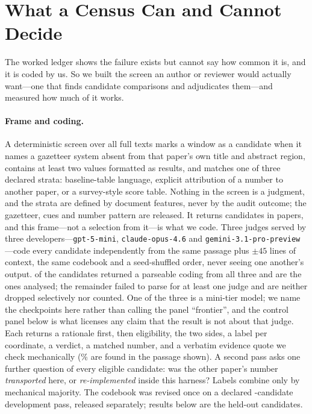 \documentclass[11pt]{article}
\begin{document}
\section{What a Census Can and Cannot Decide}
\label{sec:census}

The worked ledger shows the failure exists but cannot say how common it is, and
it is coded by us. So we built the screen an author or reviewer would actually
want---one that finds candidate comparisons and adjudicates them---and measured
how much of it works.

\paragraph{Frame and coding.}
A deterministic screen over all \FrameScreened{} full texts marks a window as a
candidate when it names a gazetteer system absent from that paper's own title
and abstract region, contains at least two values formatted as results, and
matches one of three declared strata: baseline-table language, explicit
attribution of a number to another paper, or a survey-style score table.
Nothing in the screen is a judgment, and the strata are defined by document
features, never by the audit outcome; the gazetteer, cues and number pattern
are released. It returns \FrameCandidates{} candidates in \FrameFiles{} papers,
and this frame---not a selection from it---is what we code. Three judges served
by three developers---\texttt{gpt-5-mini}, \texttt{claude-opus-4.6} and
\texttt{gemini-3.1-pro-preview}---code every candidate independently from the
same passage plus $\pm45$ lines of context, the same codebook and a
seed-shuffled order, never seeing one another's output. \CensusCoded{} of the
\FrameCandidates{} candidates returned a parseable coding from all three and
are the ones analysed; the remainder failed to parse for at least one judge and
are neither dropped selectively nor counted. One of the three is a
mini-tier model; we name the checkpoints here rather than calling the panel
``frontier'', and the control panel below is what licenses any claim that the
result is not about that judge. Each returns a rationale first, then
eligibility, the two sides, a label per coordinate, a verdict, a matched
number, and a verbatim evidence quote we check mechanically
(\CensusQuoteRate\% are found in the passage shown). A second pass asks one
further question of every eligible candidate: was the other paper's number
\emph{transported} here, or \emph{re-implemented} inside this harness? Labels
combine only by mechanical majority. The codebook was revised once on a
declared \CensusDevSize{}-candidate development pass, released separately;
results below are the \CensusHeldout{} held-out candidates.
\end{document}
